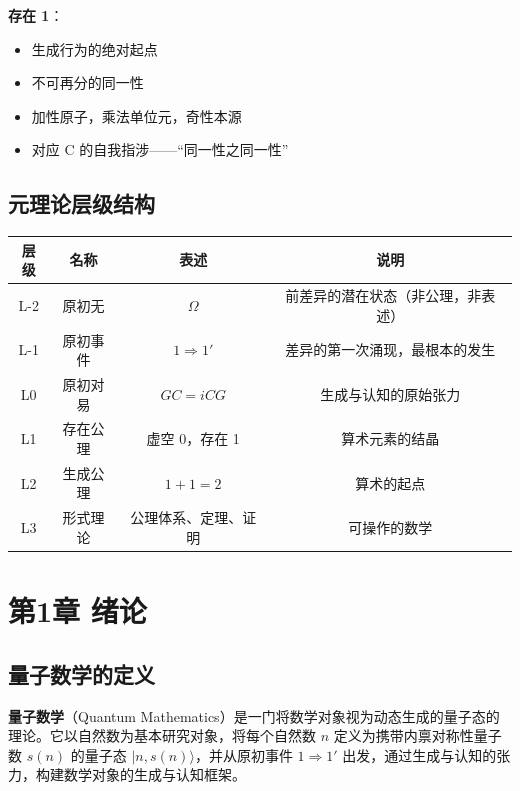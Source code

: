 \documentclass[12pt]{article}
\theoremstyle{definition}
\begin{document}
\textbf{存在 1}：
\begin{itemize}
    \item 生成行为的绝对起点
    \item 不可再分的同一性
    \item 加性原子，乘法单位元，奇性本源
    \item 对应 C 的自我指涉——“同一性之同一性”
\end{itemize}

\subsection{元理论层级结构}

\begin{center}
\begin{tabular}{|c|c|c|c|}
\hline
\textbf{层级} & \textbf{名称} & \textbf{表述} & \textbf{说明} \\
\hline
L-2 & 原初无 & \(\Omega\) & 前差异的潜在状态（非公理，非表述） \\
L-1 & 原初事件 & \(1 \Rightarrow 1'\) & 差异的第一次涌现，最根本的发生 \\
L0 & 原初对易 & \(GC = iCG\) & 生成与认知的原始张力 \\
L1 & 存在公理 & 虚空 0，存在 1 & 算术元素的结晶 \\
L2 & 生成公理 & \(1+1=2\) & 算术的起点 \\
L3 & 形式理论 & 公理体系、定理、证明 & 可操作的数学 \\
\hline
\end{tabular}
\end{center}

\newpage


\section{第1章 绪论}

\subsection{量子数学的定义}

\textbf{量子数学}（Quantum Mathematics）是一门将数学对象视为动态生成的量子态的理论。它以自然数为基本研究对象，将每个自然数 \(n\) 定义为携带内禀对称性量子数 \(s(n)\) 的量子态 \(|n, s(n)\rangle\)，并从原初事件 \(1 \Rightarrow 1'\) 出发，通过生成与认知的张力，构建数学对象的生成与认知框架。
\end{document}
